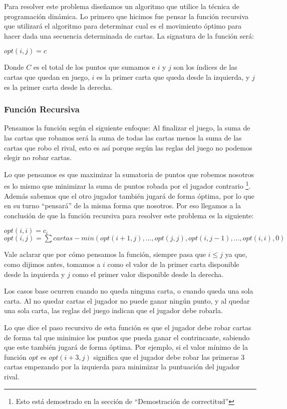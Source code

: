Para resolver este problema diseñamos un algoritmo que utilice la técnica de programación dinámica. Lo primero que hicimos fue pensar la función recursiva que utilizará el algoritmo para determinar cual es el movimiento óptimo para hacer dada una secuencia determinada de cartas. La signatura de la función será:

$opt(i,j) = c$

Donde $C$ es el total de los puntos que sumamos e $i$ y $j$ son los índices de las cartas que quedan en juego, $i$ es la primer carta que queda desde la izquierda, y $j$ es la primer carta desde la derecha.

\subsubsection{Función Recursiva}

Pensamos la función según el siguiente enfoque: Al finalizar el juego, la suma de las cartas que robamos será la suma de todas las cartas menos la suma de las cartas que robo el rival, esto es así porque según las reglas del juego no podemos elegir no robar cartas.

Lo que pensamos es que maximizar la sumatoria de puntos que robemos nosotros es lo mismo que minimizar la suma de puntos robada por el jugador contrario \footnote{Esto está demostrado en la sección de ``Demostración de correctitud''}. Además sabemos que el otro jugador también jugará de forma óptima, por lo que en su turno ``pensará'' de la misma forma que nosotros. Por eso llegamos a la conclusión de que la función recursiva para resolver este problema es la siguiente:

$opt(i,i) = c_i$ \\
$opt(i,j) = \sum cartas - min(opt(i+1, j), ..., opt(j,j), opt(i, j-1), ... ,opt(i,i), 0)$

Vale aclarar que por cómo pensamos la función, siempre pasa que $i \leq j$ ya que, como dijimos antes, tomamos a $i$ como el valor de la primer carta disponible desde la izquierda y $j$ como el primer valor disponible desde la derecha.

Los casos base ocurren cuando no queda ninguna carta, o cuando queda una sola carta. Al no quedar cartas el jugador no puede ganar ningún punto, y al quedar una sola carta, las reglas del juego indican que el jugador debe robarla.

Lo que dice el paso recursivo de esta función es que el jugador debe robar cartas de forma tal que minimice los puntos que pueda ganar el contrincante, sabiendo que este también jugará de forma óptima. Por ejemplo, si el valor mínimo de la función $opt$ es $opt(i+3,j)$ significa que el jugador debe robar las primeras 3 cartas empezando por la izquierda para minimizar la puntuación del jugador rival.

